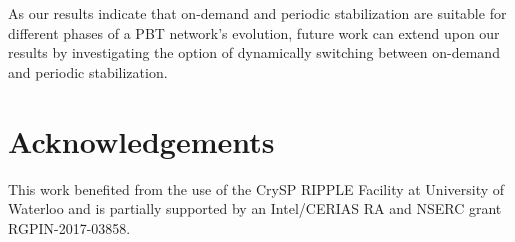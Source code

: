 As our results indicate that on-demand and periodic stabilization are suitable for different phases of a PBT network's evolution, future work can extend upon our results by investigating the option of dynamically switching between on-demand and periodic stabilization. 
 

\vspace{-1em}

\section*{Acknowledgements}
This work benefited from the use of the CrySP RIPPLE Facility at 
University of Waterloo and is partially supported by an Intel/CERIAS RA and NSERC grant
RGPIN-2017-03858. 

\vspace{-1em}

\balance

